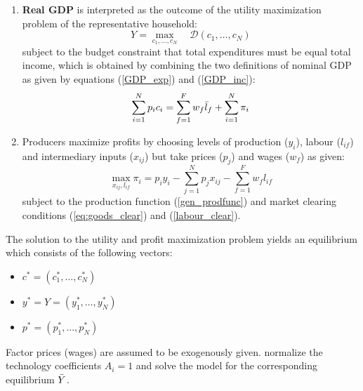 \documentclass{article}
\begin{document}
\begin{enumerate}
        \begin{equation}\label{GDP_inc}
            \text{GDP} = \sum_{f=1}^F w_f \Bar{l}_f + \sum_{i=1}^N \pi_i 
        \end{equation}
        where $w_f$ is the wage (price) of factor $f$ and $\pi_i$ is the profit of sector $i$ which are 0 if production functions $F_i$ have constant returns to scale.
    \item \textbf{Real GDP} is interpreted as the outcome of the utility maximization problem of the representative household:
        \begin{equation}\label{utilityF}
            Y = \max_{c_1, \dots, c_N} \quad \mathcal{D}(c_1, \dots, c_N)
        \end{equation}
        subject to the budget constraint that total expenditures must be equal total income, which is obtained by combining the two definitions of nominal GDP as given by equations (\ref{GDP_exp}) and (\ref{GDP_inc}): 
            \begin{equation}
                \sum_{i=1}^{N} p_i c_i = \sum_{f=1}^F w_f \Bar{l}_f + \sum_{i=1}^N \pi_i 
            \end{equation}
    \item Producers maximize profits by choosing levels of production ($y_i$), labour ($l_{if}$) and intermediary inputs ($x_{ij}$) but take prices ($p_j$) and wages ($w_f$) as given:
    \begin{equation}
            \max_{x_{ij}, l_{if}} \pi_ i = p_i y_i - \sum_{j =1}^N p_j x_{ij} - \sum_{f=1}^F w_f l_{if} 
        \end{equation}
    subject to the production function (\ref{gen_prodfunc}) and market clearing conditions (\ref{eq:goods_clear}) and (\ref{labour_clear}).

            
\end{enumerate}

The solution to the utility and profit maximization problem yields an equilibrium which consists of the following vectors:
    \begin{itemize}
        \item $c^* = (c_1^*, \dots, c_N^*)$
        \item $y^* = Y = (y_1^*, \dots, y_N^*)$
        \item $p^* = (p_1^*, \dots, p_N^*)$
    \end{itemize}
Factor prices (wages) are assumed to be exogenously given.
\parencite{BF2019} normalize the technology coefficients $A_i=1$ and solve the model for the corresponding equilibrium $\Bar{Y}$. 
\end{document}
